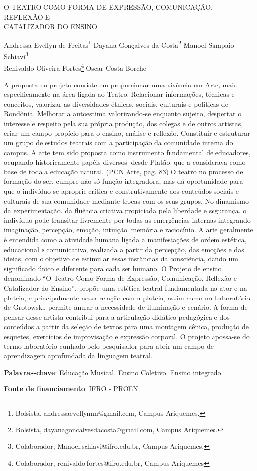 \documentclass[article,12pt,onesidea,4paper,english,brazil]{abntex2}
\begin{document}
	
	
	\frenchspacing 
	
	\begin{center}
		\LARGE O TEATRO COMO FORMA DE EXPRESSÃO, COMUNICAÇÃO, REFLEXÃO E
		\\CATALIZADOR DO ENSINO
		
		\normalsize
		Andressa Evellyn de Freitas\footnote{Bolsista, andressaevellynnn@gmail.com, Campus Ariquemes.} 
		Dayana Gonçalves da Costa\footnote{Bolsista, dayanagoncalvesdacosta@gmail.com, Campus Ariquemes.} 
		Manoel Sampaio Schiavi\footnote{Colaborador, Manoel.schiavi@ifro.edu.br, Campus Ariquemes.} \\
	Renivaldo Oliveira Fortes\footnote{Colaborador, renivaldo.fortes@ifro.edu.br, Campus Ariquemes} 
   Oscar Costa Borche
	\end{center}
	
	\noindent A proposta do projeto consiste em proporcionar uma vivência em Arte, mais
	especificamente na área ligada ao Teatro. Relacionar informações, técnicas e
	conceitos, valorizar as diversidades étnicas, sociais, culturais e políticas de
	Rondônia. Melhorar a autoestima valorizando-se enquanto sujeito, despertar o
	interesse e respeito pela sua própria produção, dos colegas e de outros artistas,
	criar um campo propício para o ensino, análise e reflexão. Constituir e estruturar um
	grupo de estudos teatrais com a participação da comunidade interna do campus.
	A arte tem sido proposta como instrumento fundamental de educadores, ocupando
	historicamente papéis diversos, desde Platão, que a considerava como base de toda
	a educação natural. (PCN Arte, pag. 83)
	O teatro no processo de formação do ser, cumpre não só função integradora, mas
	dá oportunidade para que o indivíduo se aproprie crítica e construtivamente dos
	conteúdos sociais e culturais de sua comunidade mediante trocas com os seus
	grupos. No dinamismo da experimentação, da fluência criativa propiciada pela
	liberdade e segurança, o indivíduo pode transitar livremente por todas as
	emergências internas integrando imaginação, percepção, emoção, intuição, memória
	e raciocínio. A arte geralmente é entendida como a atividade humana ligada a
	manifestações de ordem estética, educacional e comunicativa, realizada a partir da
	percepção, das emoções e das ideias, com o objetivo de estimular essas instâncias
	da consciência, dando um significado único e diferente para cada ser humano.
	O Projeto de ensino denominado “O Teatro Como Forma de Expressão,
	Comunicação, Reflexão e Catalizador do Ensino”, propõe uma estética teatral
	fundamentada no ator e na plateia, e principalmente nessa relação com a plateia,
	assim como no Laboratório de Grotowski, permite anular a necessidade de
	iluminação e cenário. A forma de pensar desse artista contribui para a articulação
	didático-pedagógica e dos conteúdos a partir da seleção de textos para uma
	montagem cênica, produção de esquetes, exercícios de improvisação e expressão
	corporal. O projeto apossa-se do termo laboratório cunhado pelo pesquisador para
	abrir um campo de aprendizagem aprofundada da linguagem teatral.
	
	\vspace{\onelineskip}
	
	\noindent
	\textbf{Palavras-chave}: Educação Musical. Ensino Coletivo. Ensino integrado.
	
	
	\noindent
	\textbf{Fonte de financiamento}: IFRO - PROEN.
\end{document}
